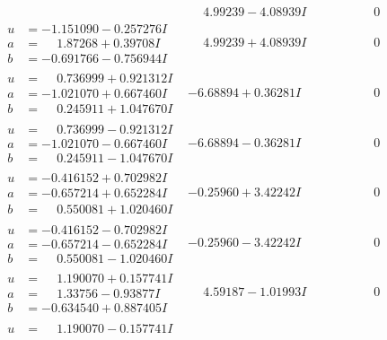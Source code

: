 \documentclass[1p]{elsarticle_modified}
\theoremstyle{definition}
\begin{document}
$$\begin{array}{c|c|c}
 & \phantom{-}4.99239 - 4.08939 I & \phantom{-0.000000 } 0 \\ \hline\begin{aligned}
u &= -1.151090 - 0.257276 I \\
a &= \phantom{-}1.87268 + 0.39708 I \\
b &= -0.691766 - 0.756944 I\end{aligned}
 & \phantom{-}4.99239 + 4.08939 I & \phantom{-0.000000 } 0 \\ \hline\begin{aligned}
u &= \phantom{-}0.736999 + 0.921312 I \\
a &= -1.021070 + 0.667460 I \\
b &= \phantom{-}0.245911 + 1.047670 I\end{aligned}
 & -6.68894 + 0.36281 I & \phantom{-0.000000 } 0 \\ \hline\begin{aligned}
u &= \phantom{-}0.736999 - 0.921312 I \\
a &= -1.021070 - 0.667460 I \\
b &= \phantom{-}0.245911 - 1.047670 I\end{aligned}
 & -6.68894 - 0.36281 I & \phantom{-0.000000 } 0 \\ \hline\begin{aligned}
u &= -0.416152 + 0.702982 I \\
a &= -0.657214 + 0.652284 I \\
b &= \phantom{-}0.550081 + 1.020460 I\end{aligned}
 & -0.25960 + 3.42242 I & \phantom{-0.000000 } 0 \\ \hline\begin{aligned}
u &= -0.416152 - 0.702982 I \\
a &= -0.657214 - 0.652284 I \\
b &= \phantom{-}0.550081 - 1.020460 I\end{aligned}
 & -0.25960 - 3.42242 I & \phantom{-0.000000 } 0 \\ \hline\begin{aligned}
u &= \phantom{-}1.190070 + 0.157741 I \\
a &= \phantom{-}1.33756 - 0.93877 I \\
b &= -0.634540 + 0.887405 I\end{aligned}
 & \phantom{-}4.59187 - 1.01993 I & \phantom{-0.000000 } 0 \\ \hline\begin{aligned}
u &= \phantom{-}1.190070 - 0.157741 I \\

\end{aligned}
\end{array}$$
\end{document}
